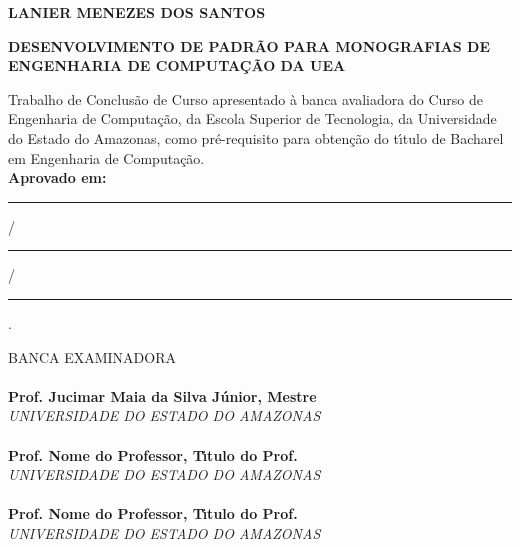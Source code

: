 \begin{center}
\bf LANIER MENEZES DOS SANTOS\\[1.5 cm]
\end{center}

\begin{center}
\bf DESENVOLVIMENTO DE PADR\~{A}O PARA MONOGRAFIAS DE ENGENHARIA DE COMPUTA\c{C}\~{A}O DA UEA\\[1.5cm]
\end{center}

\hspace*{8cm}
\begin{minipage}{8cm} 

Trabalho de Conclus\~{a}o de Curso apresentado \`{a} 
banca avaliadora do Curso de Engenharia de Computa\c{c}\~{a}o, 
da Escola Superior de Tecnologia, da Universidade do Estado do Amazonas, 
como pr\'e-requisito para obten\c{c}\~{a}o do t\'{\i}tulo de Bacharel em
Engenharia de Computa\c{c}\~{a}o.\\

\large \bf Aprovado em: \rule{.5cm}{.1mm}/\rule{.5cm}{.1mm}/\rule{.9cm}{.1mm}.
\end{minipage} 

BANCA EXAMINADORA\\[12 pt]

\noindent \hrulefill \hspace*{6cm} \\
\noindent \textbf{Prof. Jucimar Maia da Silva J\'{u}nior, Mestre}\\
\textit{UNIVERSIDADE DO ESTADO DO AMAZONAS}\\[0.5cm]

\noindent \hrulefill \hspace*{6cm} \\
\noindent \textbf{Prof. Nome do Professor, T\'{\i}tulo do Prof.}\\
\textit{UNIVERSIDADE DO ESTADO DO AMAZONAS}\\[0.5cm]

\noindent \hrulefill \hspace*{6cm} \\
\noindent \textbf{Prof. Nome do Professor, T\'{\i}tulo do Prof.}\\
\textit{UNIVERSIDADE DO ESTADO DO AMAZONAS}\\